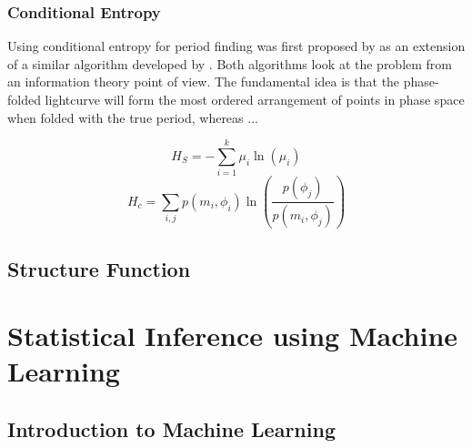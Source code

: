 

\subsubsection{Conditional Entropy}

Using conditional entropy for period finding was first proposed by \citet{graham2013} as an extension of a similar algorithm developed by \citet{cincotta1995}. Both algorithms look at the problem from an information theory point of view. The fundamental idea is that the phase-folded lightcurve will form the most ordered arrangement of points in phase space when folded with the true period, whereas ...

\begin{equation}
H_S = - \sum_{i=1}^k \mu_i \ln(\mu_i)
\end{equation}
\begin{equation}
H_c = \sum_{i,j} p(m_i, \phi_i) \ln(\frac{p(\phi_j)}{p(m_i, \phi_j)})
\end{equation}



\subsection{Structure Function}

\section{Statistical Inference using Machine Learning}

\subsection{Introduction to Machine Learning}
\label{sec:introduction-machine-learning}

